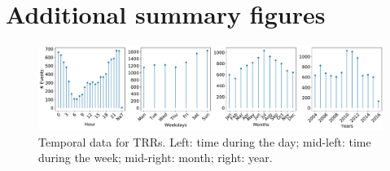 \section{Additional summary figures}\label{sec:additional_figs}

\begin{figure}[h] 
	\includegraphics[width=\textwidth]{figs/trrs_times} 
	\caption{Temporal data for TRRs. Left: time during the day; mid-left: time during the week; mid-right: month; right: year.} \label{fig:trrs_times}
\end{figure}


